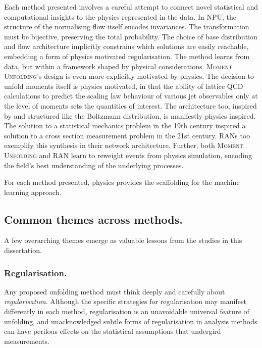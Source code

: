         Each method presented involves a careful attempt to connect novel statistical and computational insights to the physics represented in the data.
        In NPU, the structure of the normalising flow itself encodes invariances. The transformation must be bijective, preserving the total probability.
        The choice of base distribution and flow architecture implicitly constrains which solutions are easily reachable, embedding a form of physics motivated regularisation.
        The method learns from data, but within a framework shaped by physical considerations.
        \textsc{Moment Unfolding}'s design is even more explicitly motivated by physics.
        The decision to unfold moments itself is physics motivated, in that the ability of lattice QCD calculations to predict the scaling law behaviour of various jet observables only at the level of moments sets the quantities of interest.
        The architecture too, inspired by and structured like the Boltzmann distribution, is manifestly physics inspired.
        The solution to a statistical mechanics problem in the 19th century inspired a solution to a cross section measurement problem in the 21st century.
        RANs too exemplify this synthesis in their network architecture.
        Further, both \textsc{Moment Unfolding} and RAN learn to reweight events from physics simulation, encoding the field's best understanding of the underlying processes.
        
        For each method presented, physics provides the scaffolding for the machine learning approach.
    
    \subsection{Common themes across methods.}
        A few overarching themes emerge as valuable lessons from the studies in this dissertation.

        \subsubsection{Regularisation.}
        Any proposed unfolding method must think deeply and carefully about \emph{regularisation}.
        Although the specific strategies for regularisation may manifest differently in each method, regularisation is an unavoidable universal feature of unfolding, and unacknowledged subtle forms of regularisation in analysis methods can have perilous effects on the statistical assumptions that undergird measurements.
        
